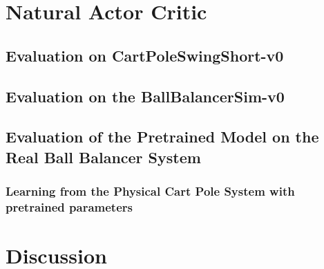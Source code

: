 \section{Natural Actor Critic}
\label{sec:nac}
\subsection{Evaluation on CartPoleSwingShort-v0}
\subsection{Evaluation on the BallBalancerSim-v0}
\subsection{Evaluation of the Pretrained Model on the Real Ball Balancer System}
\subsubsection{Learning from the Physical Cart Pole System with pretrained parameters}

\section{Discussion}
\label{sec:conclusion}






